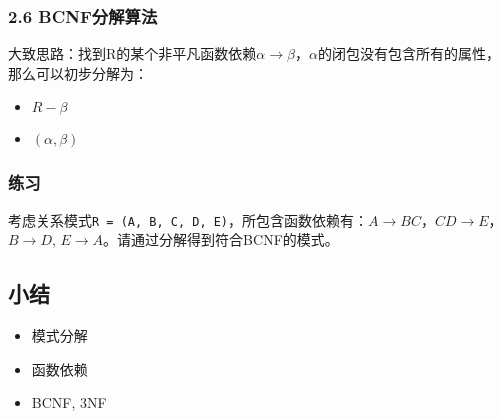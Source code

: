 \documentclass[aspectratio=169, 14pt]{beamer}
\begin{document}
\begin{frame}
    \frametitle{2.6 BCNF分解算法}
大致思路：找到R的某个非平凡函数依赖$\alpha \rightarrow \beta$，$\alpha$的闭包没有包含所有的属性，那么可以初步分解为：

\begin{itemize}
    \item $R - \beta$
    \item $(\alpha, \beta)$
\end{itemize}

\end{frame}

\begin{frame}
\end{frame}

\begin{frame}
    \frametitle{练习}

    考虑关系模式\texttt{R = (A, B, C, D, E)}，所包含函数依赖有：$A \rightarrow BC$，$CD \rightarrow E$，$B \rightarrow D$, $E \rightarrow A$。请通过分解得到符合BCNF的模式。  

\end{frame}

\begin{frame}
    \section{\textcolor{darkmidnightblue}{小结}}
    \begin{itemize}
        \item 模式分解
        \item 函数依赖
        \item BCNF, 3NF
    \end{itemize}
\end{frame}
\end{document}
